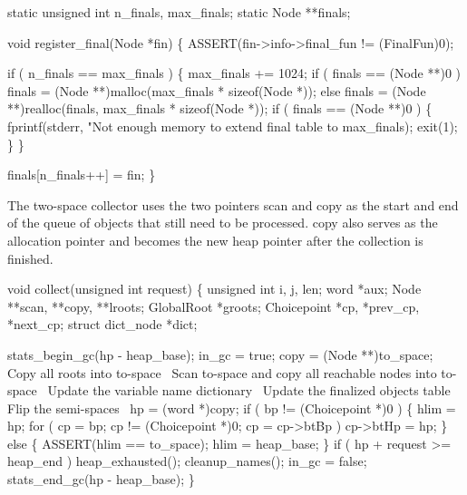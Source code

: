 \nwenddocs{}\plusendmoddef\nwstartdeflinemarkup{}\nwenddeflinemarkup
static unsigned int n_finals, max_finals;
static Node         **finals;

void
register_final(Node *fin)
\{
    ASSERT(fin->info->final_fun != (FinalFun)0);

    if ( n_finals == max_finals )
    \{
        max_finals += 1024;
        if ( finals == (Node **)0 )
            finals = (Node **)malloc(max_finals * sizeof(Node *));
        else
            finals = (Node **)realloc(finals, max_finals * sizeof(Node *));
        if ( finals == (Node **)0 )
        \{
            fprintf(stderr,
                    "Not enough memory to extend final table to %
                    max_finals);
            exit(1);
        \}
    \}

    finals[n_finals++] = fin;
\}

\nwendcode{}\nwdocspar
The two-space collector uses the two pointers {\Tt{}scan\nwendquote} and {\Tt{}copy\nwendquote} as
the start and end of the queue of objects that still need to be
processed. {\Tt{}copy\nwendquote} also serves as the allocation pointer and becomes
the new heap pointer after the collection is finished.

\nwenddocs{}\plusendmoddef\nwstartdeflinemarkup{}\nwenddeflinemarkup
void
collect(unsigned int request)
\{
    unsigned int     i, j, len;
    word             *aux;
    Node             **scan, **copy, **lroots;
    GlobalRoot       *groots;
    Choicepoint      *cp, *prev_cp, *next_cp;
    struct dict_node *dict;

    stats_begin_gc(hp - heap_base);
    in_gc = true;
    copy  = (Node **)to_space;
    \LA{}Copy all roots into to-space~{\nwtagstyle{}}\RA{}
    \LA{}Scan to-space and copy all reachable nodes into to-space~{\nwtagstyle{}}\RA{}
    \LA{}Update the variable name dictionary~{\nwtagstyle{}}\RA{}
    \LA{}Update the finalized objects table~{\nwtagstyle{}}\RA{}
    \LA{}Flip the semi-spaces~{\nwtagstyle{}}\RA{}
    hp = (word *)copy;
    if ( bp != (Choicepoint *)0 )
    \{
        hlim = hp;
        for ( cp = bp; cp != (Choicepoint *)0; cp = cp->btBp )
            cp->btHp = hp;
    \}
    else
    \{
        ASSERT(hlim == to_space);
        hlim = heap_base;
    \}
    if ( hp + request >= heap_end )
        heap_exhausted();
    cleanup_names();
    in_gc = false;
    stats_end_gc(hp - heap_base);
\}

